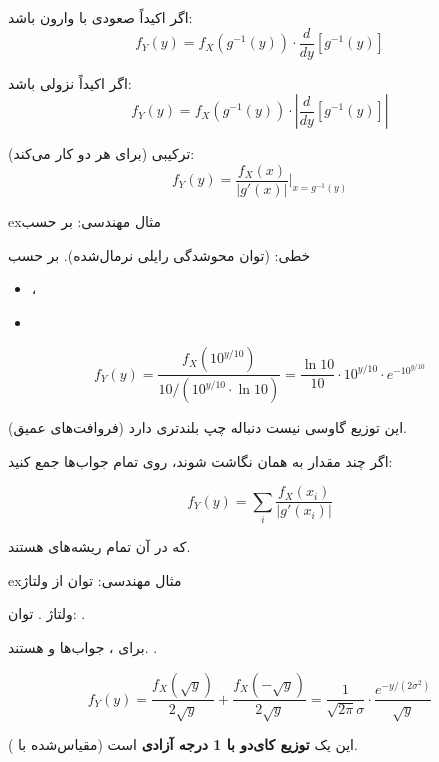 
اگر  اکیداً صعودی با وارون  باشد:\PSbr{}\[f_Y(y) = f_X(g^{-1}(y)) \cdot \frac{d}{dy}[g^{-1}(y)]\]

اگر  اکیداً نزولی باشد:\PSbr{}\[f_Y(y) = f_X(g^{-1}(y)) \cdot \left|\frac{d}{dy}[g^{-1}(y)]\right|\]

ترکیبی (برای هر دو کار می‌کند):\PSbr{}\[f_Y(y) = \frac{f_X(x)}{|g'(x)|}\bigg|_{x=g^{-1}(y)}\]

\begin{PSbox}[unbreakable]{ex}{مثال مهندسی:  بر حسب }

 خطی:  (توان محوشدگی رایلی نرمال‌شده).\PSbr{} بر حسب 

\begin{itemize}
\tightlist
\item
  ، 
\item
\end{itemize}

\[f_Y(y) = \frac{f_X(10^{y/10})}{10/(10^{y/10} \cdot \ln 10)} = \frac{\ln 10}{10} \cdot 10^{y/10} \cdot e^{-10^{y/10}}\]

این توزیع گاوسی نیست  دنباله چپ بلندتری دارد (فروافت‌های عمیق).

\end{PSbox}



اگر چند مقدار  به همان  نگاشت شوند، روی تمام جواب‌ها جمع کنید:

\[f_Y(y) = \sum_{i} \frac{f_X(x_i)}{|g'(x_i)|}\]

که در آن  تمام ریشه‌های  هستند.

\begin{PSbox}[unbreakable]{ex}{مثال مهندسی: توان از ولتاژ }

ولتاژ . توان: .

برای ، جواب‌ها  و  هستند. .

\[f_Y(y) = \frac{f_X(\sqrt{y})}{2\sqrt{y}} + \frac{f_X(-\sqrt{y})}{2\sqrt{y}} = \frac{1}{\sqrt{2\pi}\sigma} \cdot \frac{e^{-y/(2\sigma^2)}}{\sqrt{y}}\]

این یک \textbf{توزیع کای‌دو با 1 درجه آزادی} است (مقیاس‌شده با ).

\end{PSbox}

